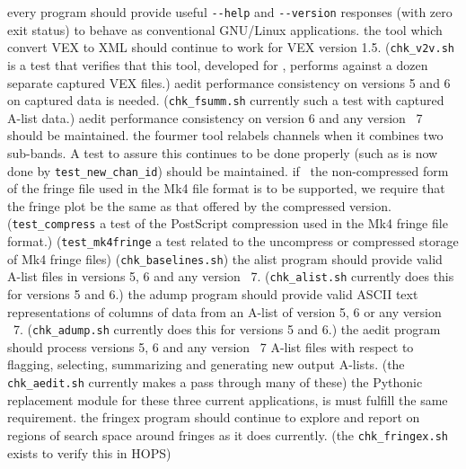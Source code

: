 \begin{description}
 every program should provide useful
    \verb+--help+ and \verb+--version+ responses (with zero exit status)
    to behave as conventional \acs{GNU/Linux} applications.
 the  tool which convert \acs{VEX} to \acs{XML}
    should continue to work for \acs{VEX} version 1.5.
    (\texttt{chk\_v2v.sh} is a test that verifies that this tool,
    developed for , performs against a dozen separate
    captured \acs{VEX} files.)
 \ac{aedit} performance consistency on versions 5 and 6
    on captured data is needed.  (\texttt{chk\_fsumm.sh} currently
    such a test with captured \ac{A-list} data.)
 \ac{aedit} performance consistency on version 6 and
    any version \TBD~7 should be maintained.
 the \acs{fourmer} tool relabels channels when it combines
    two sub-bands.  A test to assure this continues to be done
    properly (such as is now done by \texttt{test\_new\_chan\_id})
    should be maintained.
 if \TBD~the non-compressed form of the fringe file used in
    the \acs{Mk4} file format is to be supported, we require that the
    fringe plot be the same as that offered by the compressed version.
    (\texttt{test\_compress} a test of the \ac{PostScript}
    compression used in the \ac{Mk4} fringe file format.)
 
    (\texttt{test\_mk4fringe} a test related to the uncompress
    or compressed storage of \ac{Mk4} fringe files)
 
    (\texttt{chk\_baselines.sh})
 the \acs{alist} program should provide valid \acs{A-list}
    files in versions 5, 6 and any version \TBD~7.
    (\texttt{chk\_alist.sh} currently does this for versions 5 and 6.)
 the \acs{adump} program should provide valid ASCII text
    representations of columns of data from an \acs{A-list} of version
    5, 6 or any version \TBD~7.
    (\texttt{chk\_adump.sh} currently does this for versions 5 and 6.)
 the \acs{aedit} program should process versions 5, 6 and
    any version \TBD~7 \acs{A-list} files with respect to flagging,
    selecting, summarizing and generating new output \acsp{A-list}.
    (the \texttt{chk\_aedit.sh} currently makes a pass through many
    of these)
 the \acs{Python}ic replacement module for these three current
    applications, is must fulfill the same requirement.
 the \acs{fringex} program should continue to explore and report
    on regions of search space around fringes as it does currently.
    (the \texttt{chk\_fringex.sh} exists to verify this in \ac{HOPS})


\end{description}
